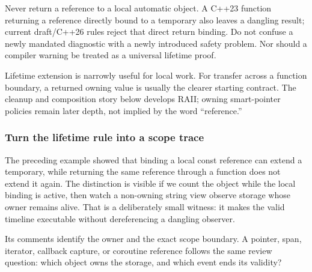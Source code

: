 Never return a reference to a local automatic object. A C++23 function returning a reference directly bound to a temporary also leaves a dangling result; current draft/C++26 rules reject that direct return binding. Do not confuse a newly mandated diagnostic with a newly introduced safety problem. Nor should a compiler warning be treated as a universal lifetime proof.

Lifetime extension is narrowly useful for local work. For transfer across a function boundary, a returned owning value is usually the clearer starting contract. The cleanup and composition story below develops RAII; owning smart-pointer policies remain later depth, not implied by the word ``reference.''

\subsubsection{Turn the lifetime rule into a scope trace}\label{01-foundations-i-ch003-turn-the-lifetime-rule-into-a-scope-trace}

The preceding example showed that binding a local const reference can extend a temporary, while returning the same reference through a function does not extend it again. The distinction is visible if we count the object while the local binding is active, then watch a non-owning string view observe storage whose owner remains alive. That is a deliberately small witness: it makes the valid timeline executable without dereferencing a dangling observer.

Its comments identify the owner and the exact scope boundary. A pointer, span, iterator, callback capture, or coroutine reference follows the same review question: which object owns the storage, and which event ends its validity?

